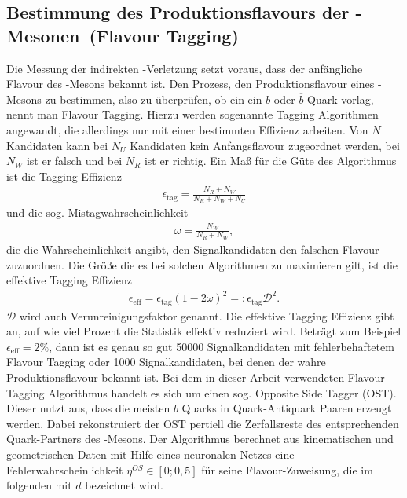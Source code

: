 \subsection[Bestimmung des Produktionsflavours der \Bd-Mesonen (Flavour Tagging)]{Bestimmung des Produktionsflavours der \boldmath\Bd-Mesonen\unboldmath\ (Flavour Tagging)} \label{kap:tagging}
Die Messung der indirekten \CP-Verletzung setzt voraus, dass der anfängliche Flavour des \Bd-Mesons bekannt ist. Den Prozess, den Produktionsflavour eines \Bd-Mesons zu bestimmen, also zu überprüfen, ob ein ein $b$ oder $\overline{b}$ Quark vorlag, nennt man Flavour Tagging. Hierzu werden sogenannte Tagging Algorithmen angewandt, die allerdings nur mit einer bestimmten Effizienz arbeiten. Von $N$ Kandidaten kann bei $N_U$ Kandidaten kein Anfangsflavour zugeordnet werden, bei $N_W$ ist er falsch und bei $N_R$ ist er richtig. Ein Maß für die Güte des Algorithmus ist die Tagging Effizienz
\begin{align}
\epsilon_{\text{tag}} = \frac{N_R+N_W}{N_R+N_W+N_U}
\end{align}
und die sog. Mistagwahrscheinlichkeit
\begin{align}
\omega = \frac{N_W}{N_R+N_W},
\end{align}
die die Wahrscheinlichkeit angibt, den Signalkandidaten den falschen Flavour zuzuordnen. Die Größe die es bei solchen Algorithmen zu maximieren gilt, ist die effektive Tagging Effizienz
\begin{align}
\epsilon_{\text{eff}} = \epsilon_{\text{tag}}(1-2\omega)^2 =: \epsilon_{\text{tag}} \mathcal{D}^2.
\end{align}
$\mathcal{D}$ wird auch Verunreinigungsfaktor genannt. Die effektive Tagging Effizienz gibt an, auf wie viel Prozent die Statistik effektiv reduziert wird. Beträgt zum Beispiel $\epsilon_{\text{eff}} = 2\%$, dann ist es genau so gut 50000 Signalkandidaten mit fehlerbehaftetem Flavour Tagging oder 1000 Signalkandidaten, bei denen der wahre Produktionsflavour bekannt ist. Bei dem in dieser Arbeit verwendeten Flavour Tagging Algorithmus handelt es sich um einen sog. Opposite Side Tagger (OST). Dieser nutzt aus, dass die meisten $b$ Quarks in Quark-Antiquark Paaren erzeugt werden. Dabei rekonstruiert der OST pertiell die Zerfallsreste des entsprechenden Quark-Partners des \Bd-Mesons. Der Algorithmus berechnet aus kinematischen und geometrischen Daten mit Hilfe eines neuronalen Netzes eine Fehlerwahrscheinlichkeit $\eta^{OS} \in [0;0,5]$ für seine Flavour-Zuweisung, die im folgenden mit $d$ bezeichnet wird. \cite{lhcb-paper}


